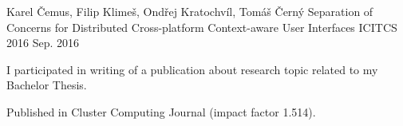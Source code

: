 \begin{cventries}
  \cventry
    {Karel Čemus, Filip Klimeš, Ondřej Kratochvíl, Tomáš Černý}
    {Separation of Concerns for Distributed Cross-platform Context-aware User Interfaces}
    {ICITCS 2016}
    {Sep. 2016}
    {
      \begin{cvitems}
        \item {I participated in writing of a publication about research topic related to my Bachelor Thesis.}
        \item {Published in Cluster Computing Journal (impact factor 1.514).}
      \end{cvitems}
    }
\end{cventries}

